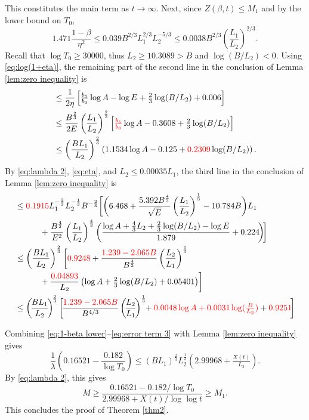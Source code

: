 \documentclass[10pt]{amsart}
\theoremstyle{remark}
\theoremstyle{plain}
\numberwithin{equation}{section}
\theoremstyle{definition}
\def\({\left(}
\def\){\right)}
\def\pfrac#1#2{\left(\frac{#1}{#2}\right)}
\def\lam{\lambda}
\newcommand{\rev}[1]{{\color{red}#1}}
\begin{document}
This constitutes the main term as $t\to \infty$.  Next, since
$Z(\beta,t)\le M_1$ and by the lower bound on $T_0$,
\begin{equation}
1.471 \frac{1-\beta}{\eta^2} \le 0.039 B^{2/3} L_1^{2/3} L_2^{-5/3}
\le 0.0038 B^{2/3} \pfrac{L_1}{L_2}^{2/3}.
\label{eq:error term 1}
\end{equation}
\rev{Recall that $\log T_0 \ge 30000$, thus $L_2 \ge 10.3089 > B$
and $\log(B/L_2)<0$.}
Using \eqref{eq:log(1+eta)},
the remaining part of the second line in the conclusion of Lemma
 \ref{lem:zero inequality} is
\begin{equation}
\begin{split}
& \le\frac{1}{2\eta} \left[ \tfrac{b_5}{b_0}\log A - \log E + 
  \tfrac23 \log(B/L_2) +0.006\right]  \\
&\le \frac{B^{\frac23}}{2E} \pfrac{L_1}{L_2}^{\frac23}
  \left[ \rev{\tfrac{b_5}{b_0}}\log A-0.3608+\tfrac23 \log (B/L_2) \right] \\
&\le \pfrac{BL_1}{L_2}^{\frac23} \( 1.1534\log A-0.125+\rev{0.2309}\log(B/L_2) \).
\end{split}
\label{eq:error term 2}
\end{equation}
By \eqref{eq:lambda 2}, \eqref{eq:eta}, and $L_2 \le 0.00035L_1$,
 the third line in the conclusion of Lemma \ref{lem:zero inequality} is
\begin{equation}
\begin{split}
&\le \rev{0.1915} L_1^{-\frac23} L_2^{-\frac13} B^{-\frac23} \biggl[ \biggl( 6.468+
  \frac{5.392 B^{\frac43}}{\sqrt{E}} \pfrac{L_1}{L_2}^{\frac13} - 10.784 B
   \biggr)L_1 \\
&\qquad\quad + \frac{B^{\frac43}}{E^2} \pfrac{L_1}{L_2}^{\frac43} \( 
  \frac{\log A +\tfrac43 L_2 + \tfrac23 \log(B/L_2)-\log E}{1.879}+0.224\! \)
   \! \biggr] \\
&\le \pfrac{BL_1}{L_2}^{\frac23}\biggl[ \rev{0.9248}+\frac{\rev{1.239-2.065 B}}
  {B^{\frac43}} \pfrac{L_2}{L_1}^{\frac13} \\
&\qquad\quad  + \frac{\rev{0.04893}}{L_2}
  \( \log A + \tfrac23\log (B/L_2)+0.05401 \) \biggr] \\
&\le \(\!\frac{BL_1}{L_2}\!\)^{\!\frac23}\biggl[\! \frac{\rev{1.239-2.065 B}}{B^{4/3}}
  \(\!\frac{L_2}{L_1}\!\)^{\frac13}\!\!+\rev{0.0048 \log A +0.0031
  \log(\tfrac{B}{L_2})}+\rev{0.9251}\!\biggr]
\end{split}
\label{eq:error term 3}
\end{equation}

Combining \eqref{eq:1-beta lower}--\eqref{eq:error term 3}
with Lemma \ref{lem:zero inequality} gives
$$
\frac{1}{\lam} \( 0.16521 - \frac{0.182}{\log T_0}\) \le
 (BL_1)^{\frac23} L_2^{\frac13} \( 2.99968 + \tfrac{X(t)}{L_2} \).
$$
By \eqref{eq:lambda 2}, this gives
$$
M \ge \frac{0.16521-0.182/\log T_0}{2.99968+X(t)/\log\log t} \ge M_1.
$$
This concludes the proof of Theorem \ref{thm2}.
\bigskip
\end{document}
